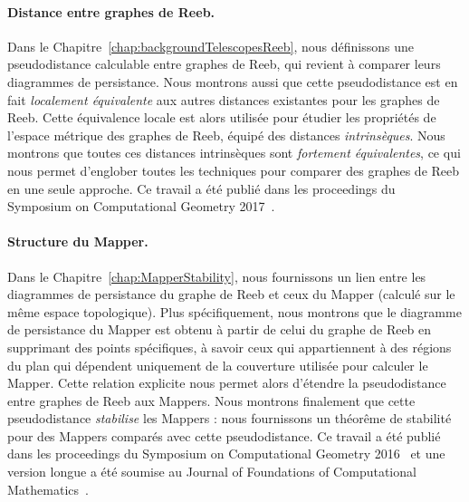 \paragraph*{Distance entre graphes de Reeb.} Dans le Chapitre~\ref{chap:backgroundTelescopesReeb}, nous d\'efinissons une pseudodistance calculable
entre graphes de Reeb, qui revient \`a comparer leurs diagrammes de persistance.
Nous montrons aussi que cette pseudodistance est en fait {\em localement \'equivalente} aux autres distances existantes pour les graphes de Reeb.
Cette \'equivalence locale est alors utilis\'ee pour \'etudier les propri\'et\'es de l'espace m\'etrique des graphes de Reeb, 
\'equip\'e des distances {\em intrins\`eques}.
Nous montrons que toutes ces distances intrins\`eques sont {\em fortement \'equivalentes}, ce qui nous permet d'englober toutes les techniques
pour comparer des graphes de Reeb en une seule approche. Ce travail a \'et\'e publi\'e dans les proceedings du Symposium on 
Computational Geometry 2017~\cite{Carriere17a}.   


\paragraph*{Structure du Mapper.} Dans le Chapitre~\ref{chap:MapperStability}, nous fournissons un lien entre les diagrammes de persistance
du graphe de Reeb et ceux du Mapper (calcul\'e sur le m\^eme espace topologique).
Plus sp\'ecifiquement, nous montrons que le diagramme de persistance du Mapper est obtenu \`a partir de celui du graphe de Reeb en supprimant 
des points sp\'ecifiques, \`a savoir ceux qui appartiennent \`a des r\'egions du plan qui d\'ependent uniquement de la couverture utilis\'ee pour calculer le Mapper.
Cette relation explicite nous permet alors d'\'etendre la pseudodistance entre graphes de Reeb aux Mappers. Nous montrons
finalement que cette pseudodistance {\em stabilise} les Mappers : nous fournissons un th\'eor\^eme de stabilit\'e pour des Mappers compar\'es avec cette pseudodistance.
Ce travail a \'et\'e publi\'e dans les proceedings du Symposium on Computational Geometry 2016~\cite{Carriere16} et une version longue a \'et\'e soumise au 
Journal of Foundations of Computational Mathematics~\cite{Carriere15c}.

